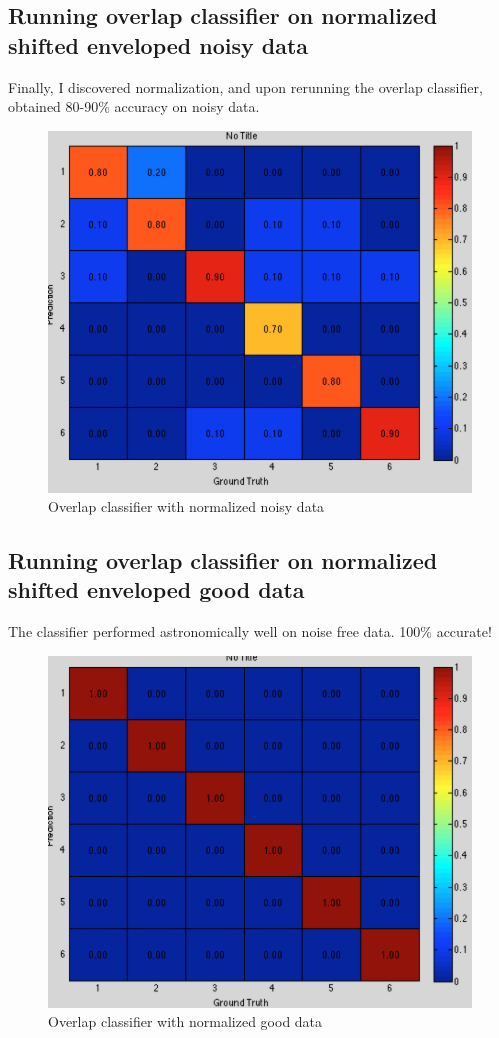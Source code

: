 \documentclass[12pt]{article}
\begin{document}
\FloatBarrier
\subsection{Running overlap classifier on normalized shifted enveloped noisy data}
Finally, I discovered normalization, and upon rerunning the overlap classifier, obtained 80-90\% accuracy on noisy data.

\begin{figure}[h!]
\centering
\includegraphics[scale=0.6]{finalnoisy.png}
\caption{Overlap classifier with normalized noisy data}
\end{figure}


\FloatBarrier
\subsection{Running overlap classifier on normalized shifted enveloped good data}
The classifier performed astronomically well on noise free data. 100\% accurate!

\begin{figure}[h!]
\centering
\includegraphics[scale=0.6]{finalhard.png}
\caption{Overlap classifier with normalized good data}
\end{figure}
\end{document}
